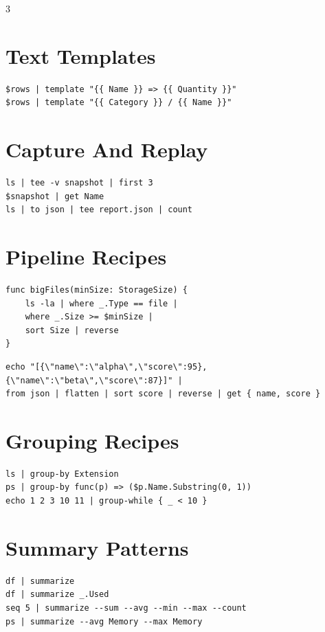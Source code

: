\begin{multicols*}{3}
\section{Text Templates}
\begin{lstlisting}
$rows | template "{{ Name }} => {{ Quantity }}"
$rows | template "{{ Category }} / {{ Name }}"
\end{lstlisting}

\section{Capture And Replay}
\begin{lstlisting}
ls | tee -v snapshot | first 3
$snapshot | get Name
ls | to json | tee report.json | count
\end{lstlisting}

\columnbreak

\section{Pipeline Recipes}
\begin{lstlisting}
func bigFiles(minSize: StorageSize) {
    ls -la | where _.Type == file |
    where _.Size >= $minSize |
    sort Size | reverse
}
\end{lstlisting}

\begin{lstlisting}
echo "[{\"name\":\"alpha\",\"score\":95},{\"name\":\"beta\",\"score\":87}]" |
from json | flatten | sort score | reverse | get { name, score }
\end{lstlisting}

\section{Grouping Recipes}
\begin{lstlisting}
ls | group-by Extension
ps | group-by func(p) => ($p.Name.Substring(0, 1))
echo 1 2 3 10 11 | group-while { _ < 10 }
\end{lstlisting}


\section{Summary Patterns}
\begin{lstlisting}
df | summarize
df | summarize _.Used
seq 5 | summarize --sum --avg --min --max --count
ps | summarize --avg Memory --max Memory
\end{lstlisting}


\end{multicols*}
